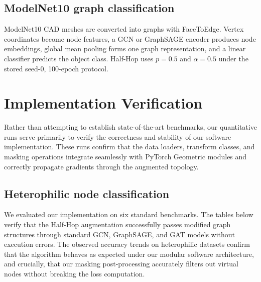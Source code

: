 \documentclass[conference]{IEEEtran}
\begin{document}
\subsection{ModelNet10 graph classification}
ModelNet10 \cite{wu} CAD meshes are converted into graphs with FaceToEdge. Vertex coordinates become node features, a GCN \cite{kipf} or GraphSAGE \cite{hamilton} encoder produces node embeddings, global mean pooling forms one graph representation, and a linear classifier predicts the object class. Half-Hop uses $p=0.5$ and $\alpha=0.5$ under the stored seed-0, 100-epoch protocol.

\section{Implementation Verification}
Rather than attempting to establish state-of-the-art benchmarks, our quantitative runs serve primarily to verify the correctness and stability of our software implementation. These runs confirm that the data loaders, transform classes, and masking operations integrate seamlessly with PyTorch Geometric modules and correctly propagate gradients through the augmented topology.

\subsection{Heterophilic node classification}
We evaluated our implementation on six standard benchmarks. The tables below verify that the Half-Hop augmentation successfully passes modified graph structures through standard GCN, GraphSAGE, and GAT models without execution errors. The observed accuracy trends on heterophilic datasets confirm that the algorithm behaves as expected under our modular software architecture, and crucially, that our masking post-processing accurately filters out virtual nodes without breaking the loss computation.

\begin{table}[H]
\centering\small
\caption{GCN test accuracy (\%) over ten splits.}
\label{tab:gcn}
\end{table}
\end{document}
